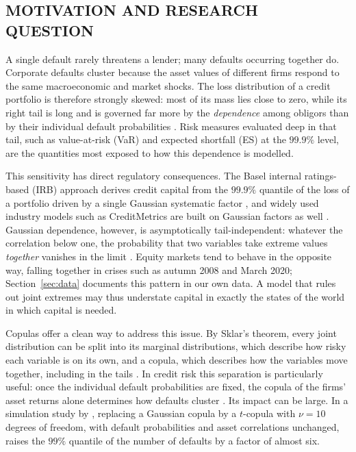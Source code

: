 \subsection{MOTIVATION AND RESEARCH QUESTION}
\label{subsec:motivation}

A single default rarely threatens a lender; many defaults occurring together do. Corporate defaults cluster because the asset values of different firms respond to the same macroeconomic and market shocks. The loss distribution of a credit portfolio is therefore strongly skewed: most of its mass lies close to zero, while its right tail is long and is governed far more by the \emph{dependence} among obligors than by their individual default probabilities \citep[Ch.~8]{McNeil05}. Risk measures evaluated deep in that tail, such as value-at-risk (VaR) and expected shortfall (ES) at the $99.9\%$ level, are the quantities most exposed to how this dependence is modelled.

This sensitivity has direct regulatory consequences. The Basel internal ratings-based (IRB) approach derives credit capital from the $99.9\%$ quantile of the loss of a portfolio driven by a single Gaussian systematic factor \citep[Sect.~6.4]{DeGiorgiFilkova26}, and widely used industry models such as CreditMetrics are built on Gaussian factors as well \citep[Sect.~8.2]{McNeil05}. Gaussian dependence, however, is asymptotically tail-independent: whatever the correlation below one, the probability that two variables take extreme values \emph{together} vanishes in the limit \citep[Sect.~5.2.3]{McNeil05}. Equity markets tend to behave in the opposite way, falling together in crises such as autumn 2008 and March 2020; Section~\ref{sec:data} documents this pattern in our own data. A model that rules out joint extremes may thus understate capital in exactly the states of the world in which capital is needed.

Copulas offer a clean way to address this issue. By Sklar's theorem, every joint distribution can be split into its marginal distributions, which describe how risky each variable is on its own, and a copula, which describes how the variables move together, including in the tails \citep[Ch.~5]{McNeil05}. In credit risk this separation is particularly useful: once the individual default probabilities are fixed, the copula of the firms' asset returns alone determines how defaults cluster \citep[Sect.~8.3]{McNeil05}. Its impact can be large. In a simulation study by \citet[Table~8.4]{McNeil05}, replacing a Gaussian copula by a $t$-copula with $\nu=10$ degrees of freedom, with default probabilities and asset correlations unchanged, raises the $99\%$ quantile of the number of defaults by a factor of almost six.

